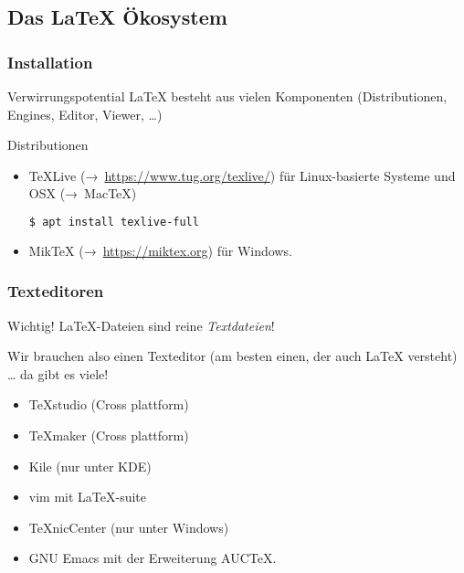 \documentclass{cms-kurs}
\begin{document}
\subsection{Das \LaTeX{} Ökosystem}

\begin{frame}[fragile]
  \frametitle{Installation}

  \onslide<+->

  \begin{block}{Verwirrungspotential}
    \LaTeX{} besteht aus vielen Komponenten (Distributionen, Engines, Editor,
    Viewer, \ldots)
  \end{block}

  \onslide<+->

  \bigskip{}

  \begin{block}{Distributionen}
    \begin{itemize}
    \item \TeX{}Live (→ \url{https://www.tug.org/texlive/}) für
      Linux-basierte Systeme und OSX (→ Mac\TeX)
\begin{lstlisting}[language=Bash]
$ apt install texlive-full
\end{lstlisting}
    \item Mik\TeX{} (→ \url{https://miktex.org}) für Windows.
    \end{itemize}
  \end{block}

\end{frame}

\begin{frame}
  \frametitle{Texteditoren}

  \onslide<+->

  \begin{block}{Wichtig!}
    \LaTeX-Dateien sind reine \emph{Textdateien}!
  \end{block}

  \onslide<+->

  Wir brauchen also einen Texteditor (am besten einen, der auch \LaTeX{}
  versteht) \dots{} \onslide<+-> da gibt es viele!
  \begin{itemize}
  \item TeXstudio (Cross plattform)
  \item TeXmaker  (Cross plattform)
  \item Kile      (nur unter KDE)
  \item vim mit LaTeX-suite
  \item TeXnicCenter (nur unter Windows)
  \item GNU Emacs mit der Erweiterung AUCTeX.
  \end{itemize}

\end{frame}
\end{document}
